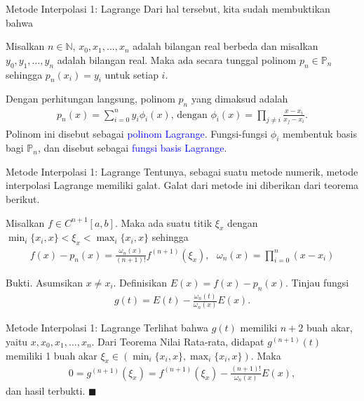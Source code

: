 \documentclass[xcolor={dvipsnames}, 9pt]{beamer}
\newcommand{\emp}[1]{\textcolor{Blue}{#1}}
\begin{document}
    \begin{frame}{Metode Interpolasi 1: Lagrange}
        Dari hal tersebut, kita sudah membuktikan bahwa
        \begin{theorem}
            Misalkan $n\in\mathbb{N}$, $x_0,x_1,\dots,x_n$ adalah bilangan real berbeda dan misalkan $y_0,y_1,\dots,y_n$ adalah bilangan real. Maka ada secara tunggal polinom $p_n\in\mathbb{P}_n$ sehingga $p_n(x_i)=y_i$ untuk setiap $i$.
        \end{theorem}
        Dengan perhitungan langsung, polinom $p_n$ yang dimaksud adalah
        \begin{align*}
            p_n(x) = \sum_{i=0}^{n} y_i\phi_i(x) \text{, dengan } \phi_i(x)=\prod_{j\neq i} \frac{x-x_i}{x_j-x_i}.
        \end{align*}
        Polinom ini disebut sebagai \emp{polinom Lagrange}. Fungsi-fungsi $\phi_i$ membentuk basis bagi $\mathbb{P}_n$, dan disebut sebagai \emp{fungsi basis Lagrange}.
    \end{frame}
    \begin{frame}{Metode Interpolasi 1: Lagrange}
        Tentunya, sebagai suatu metode numerik, metode interpolasi Lagrange memiliki galat. Galat dari metode ini diberikan dari teorema berikut.
        \begin{theorem}
            Misalkan $f\in C^{n+1}[a,b]$. Maka ada suatu titik $\xi_x$ dengan $\min_i\{x_i,x\} < \xi_x < \max_i\{x_i,x\}$ sehingga
            \begin{align*}
                f(x)-p_n(x) = \frac{\omega_n(x)}{(n+1)!}f^{(n+1)}(\xi_x), \text{ } \omega_n(x)=\prod_{i=0}^n (x-x_i)
            \end{align*}
        \end{theorem}
        Bukti. Asumsikan $x\neq x_i$. Definisikan $E(x)=f(x)-p_n(x)$. Tinjau fungsi
        \begin{align*}
            g(t) = E(t) - \frac{\omega_n(t)}{\omega_n(x)}E(x).
        \end{align*}
    \end{frame}
    \begin{frame}{Metode Interpolasi 1: Lagrange}
        Terlihat bahwa $g(t)$ memiliki $n+2$ buah akar, yaitu $x,x_0,x_1,\dots,x_n$. Dari Teorema Nilai Rata-rata, didapat $g^{(n+1)}(t)$ memiliki 1 buah akar $\xi_x\in(\min_i\{x_i,x\},\max_i\{x_i,x\})$. Maka
        \begin{align*}
            0 = g^{(n+1)}(\xi_x) = f^{(n+1)}(\xi_x) - \frac{(n+1)!}{\omega_n(x)}E(x),
        \end{align*}
        dan hasil terbukti. $\blacksquare$ \newline
    \end{frame}
\end{document}
